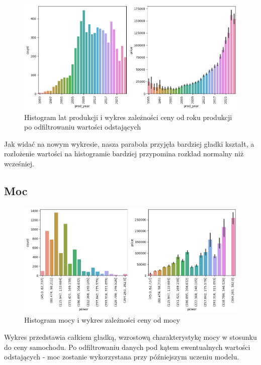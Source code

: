 \documentclass{article}
\begin{document}
\begin{figure}[H]
    \centering
    \includegraphics[width=1\linewidth]{images/rok_produkcji_po.png}
    \caption{Histogram lat produkcji i wykres zależności ceny od roku produkcji po odfiltrowaniu wartości odstających}
    \label{plt:prod_year_aft}
\end{figure}

Jak widać na nowym wykresie, nasza parabola przyjęła bardziej gładki kształt, a rozłożenie wartości na histogramie bardziej przypomina rozkład normalny niż wcześniej. 

\subsection{Moc}
\begin{figure}[H]
    \centering
    \includegraphics[width=1\linewidth]{images/moc_przed.png}
    \caption{Histogram mocy i wykres zależności ceny od mocy}
    \label{plt:power_bef}
\end{figure}
Wykres przedstawia całkiem gładką, wzrostową charakterystykę mocy w stosunku do ceny samochodu. Po odfiltrowaniu danych pod kątem ewentualnych wartości odstających - moc zostanie wykorzystana przy późniejszym uczeniu modelu.

\end{document}
